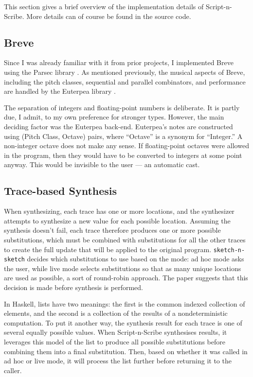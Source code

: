 \documentclass[nocopyrightspace,numbers,10pt]{sigplanconf}
\newcommand{\sketch}{\texttt{sketch-n-sketch}}
\newcommand{\sns}{Script-n-Scribe}
\begin{document}
This section gives a brief overview of the implementation details of \sns{}.
More details can of course be found in the source code.

\subsection{Breve}
\label{sub:impl:breve}

Since I was already familiar with it from prior projects, I implemented Breve
using the Parsec library \cite{parsec}. As mentioned previously, the musical
aspects of Breve, including the pitch classes, sequential and parallel
combinators, and performance are handled by the Euterpea library \cite{eut}.

The separation of integers and floating-point numbers is deliberate. It is
partly due, I admit, to my own preference for stronger types. However, the main
deciding factor was the Euterpea back-end. Euterpea's notes are constructed
using (Pitch Class, Octave) pairs, where ``Octave'' is a synonym for
``Integer.'' A non-integer octave does not make any sense. If floating-point
octaves were allowed in the program, then they would have to be converted to
integers at some point anyway. This would be invisible to the user --- an
automatic cast.

\subsection{Trace-based Synthesis}
\label{sub:impl:tsb}

When synthesizing, each trace has one or more locations, and the synthesizer
attempts to synthesize a new value for each possible location. Assuming the
synthesis doesn't fail, each trace therefore produces one or more possible
substitutions, which must be combined with substitutions for all the other
traces to create the full update that will be applied to the original program.
\sketch{} decides which substitutions to use based on the mode: ad hoc mode asks
the user, while live mode selects substitutions so that as many unique locations
are used as possible, a sort of round-robin approach. The paper suggests that
this decision is made before synthesis is performed.

In Haskell, lists have two meanings: the first is the common indexed collection
of elements, and the second is a collection of the results of a nondeterministic
computation. To put it another way, the synthesis result for each trace is one
of several equally possible values. When \sns{} synthesises results, it
leverages this model of the list to produce all possible substitutions before
combining them into a final substitution. Then, based on whether it was called
in ad hoc or live mode, it will process the list further before returning it to
the caller.
\end{document}
